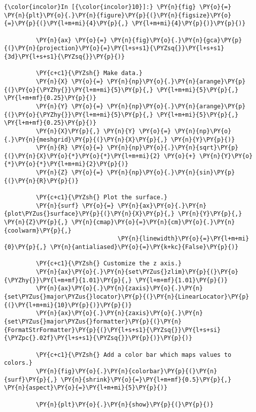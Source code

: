     \begin{Verbatim}[commandchars=\\\{\},frame=single,framerule=0.3mm,rulecolor=\color{cellframecolor}]
{\color{incolor}In [{\color{incolor}10}]:} \PY{n}{fig} \PY{o}{=} \PY{n}{plt}\PY{o}{.}\PY{n}{figure}\PY{p}{(}\PY{n}{figsize}\PY{o}{=}\PY{p}{(}\PY{l+m+mi}{4}\PY{p}{,} \PY{l+m+mi}{4}\PY{p}{)}\PY{p}{)}
         
         \PY{n}{ax} \PY{o}{=} \PY{n}{fig}\PY{o}{.}\PY{n}{gca}\PY{p}{(}\PY{n}{projection}\PY{o}{=}\PY{l+s+s1}{\PYZsq{}}\PY{l+s+s1}{3d}\PY{l+s+s1}{\PYZsq{}}\PY{p}{)}
         
         \PY{c+c1}{\PYZsh{} Make data.}
         \PY{n}{X} \PY{o}{=} \PY{n}{np}\PY{o}{.}\PY{n}{arange}\PY{p}{(}\PY{o}{\PYZhy{}}\PY{l+m+mi}{5}\PY{p}{,} \PY{l+m+mi}{5}\PY{p}{,} \PY{l+m+mf}{0.25}\PY{p}{)}
         \PY{n}{Y} \PY{o}{=} \PY{n}{np}\PY{o}{.}\PY{n}{arange}\PY{p}{(}\PY{o}{\PYZhy{}}\PY{l+m+mi}{5}\PY{p}{,} \PY{l+m+mi}{5}\PY{p}{,} \PY{l+m+mf}{0.25}\PY{p}{)}
         \PY{n}{X}\PY{p}{,} \PY{n}{Y} \PY{o}{=} \PY{n}{np}\PY{o}{.}\PY{n}{meshgrid}\PY{p}{(}\PY{n}{X}\PY{p}{,} \PY{n}{Y}\PY{p}{)}
         \PY{n}{R} \PY{o}{=} \PY{n}{np}\PY{o}{.}\PY{n}{sqrt}\PY{p}{(}\PY{n}{X}\PY{o}{*}\PY{o}{*}\PY{l+m+mi}{2} \PY{o}{+} \PY{n}{Y}\PY{o}{*}\PY{o}{*}\PY{l+m+mi}{2}\PY{p}{)}
         \PY{n}{Z} \PY{o}{=} \PY{n}{np}\PY{o}{.}\PY{n}{sin}\PY{p}{(}\PY{n}{R}\PY{p}{)}
         
         \PY{c+c1}{\PYZsh{} Plot the surface.}
         \PY{n}{surf} \PY{o}{=} \PY{n}{ax}\PY{o}{.}\PY{n}{plot\PYZus{}surface}\PY{p}{(}\PY{n}{X}\PY{p}{,} \PY{n}{Y}\PY{p}{,} \PY{n}{Z}\PY{p}{,} \PY{n}{cmap}\PY{o}{=}\PY{n}{cm}\PY{o}{.}\PY{n}{coolwarm}\PY{p}{,}
                                \PY{n}{linewidth}\PY{o}{=}\PY{l+m+mi}{0}\PY{p}{,} \PY{n}{antialiased}\PY{o}{=}\PY{k+kc}{False}\PY{p}{)}
         
         \PY{c+c1}{\PYZsh{} Customize the z axis.}
         \PY{n}{ax}\PY{o}{.}\PY{n}{set\PYZus{}zlim}\PY{p}{(}\PY{o}{\PYZhy{}}\PY{l+m+mf}{1.01}\PY{p}{,} \PY{l+m+mf}{1.01}\PY{p}{)}
         \PY{n}{ax}\PY{o}{.}\PY{n}{zaxis}\PY{o}{.}\PY{n}{set\PYZus{}major\PYZus{}locator}\PY{p}{(}\PY{n}{LinearLocator}\PY{p}{(}\PY{l+m+mi}{10}\PY{p}{)}\PY{p}{)}
         \PY{n}{ax}\PY{o}{.}\PY{n}{zaxis}\PY{o}{.}\PY{n}{set\PYZus{}major\PYZus{}formatter}\PY{p}{(}\PY{n}{FormatStrFormatter}\PY{p}{(}\PY{l+s+s1}{\PYZsq{}}\PY{l+s+si}{\PYZpc{}.02f}\PY{l+s+s1}{\PYZsq{}}\PY{p}{)}\PY{p}{)}
         
         \PY{c+c1}{\PYZsh{} Add a color bar which maps values to colors.}
         \PY{n}{fig}\PY{o}{.}\PY{n}{colorbar}\PY{p}{(}\PY{n}{surf}\PY{p}{,} \PY{n}{shrink}\PY{o}{=}\PY{l+m+mf}{0.5}\PY{p}{,} \PY{n}{aspect}\PY{o}{=}\PY{l+m+mi}{5}\PY{p}{)}
         
         \PY{n}{plt}\PY{o}{.}\PY{n}{show}\PY{p}{(}\PY{p}{)}
\end{Verbatim}


